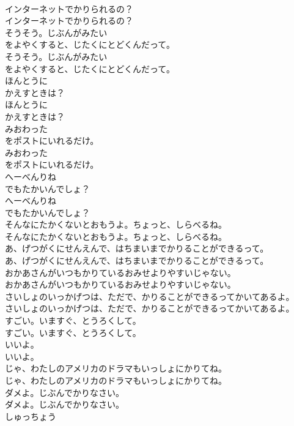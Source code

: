 \documentclass[8pt]{extreport}
\begin{document}
\begin{CJK}{UTF8}{min}
\\	インターネットでかりられるの？
\\	インターネットでかりられるの？
\\	そうそう。じぶんがみたい
\\	をよやくすると、じたくにとどくんだって。
\\	そうそう。じぶんがみたい
\\	をよやくすると、じたくにとどくんだって。
\\	ほんとうに
\\	かえすときは？
\\	ほんとうに
\\	かえすときは？
\\	みおわった
\\	をポストにいれるだけ。
\\	みおわった
\\	をポストにいれるだけ。
\\	へーべんりね
\\	でもたかいんでしょ？
\\	へーべんりね
\\	でもたかいんでしょ？
\\	そんなにたかくないとおもうよ。ちょっと、しらべるね。
\\	そんなにたかくないとおもうよ。ちょっと、しらべるね。
\\	あ、げつがくにせんえんで、はちまいまでかりることができるって。
\\	あ、げつがくにせんえんで、はちまいまでかりることができるって。
\\	おかあさんがいつもかりているおみせよりやすいじゃない。
\\	おかあさんがいつもかりているおみせよりやすいじゃない。
\\	さいしょのいっかげつは、ただで、かりることができるってかいてあるよ。
\\	さいしょのいっかげつは、ただで、かりることができるってかいてあるよ。
\\	すごい。いますぐ、とうろくして。
\\	すごい。いますぐ、とうろくして。
\\	いいよ。
\\	いいよ。
\\	じゃ、わたしのアメリカのドラマもいっしょにかりてね。
\\	じゃ、わたしのアメリカのドラマもいっしょにかりてね。
\\	ダメよ。じぶんでかりなさい。
\\	ダメよ。じぶんでかりなさい。
\\	しゅっちょう

\end{CJK}
\end{document}
